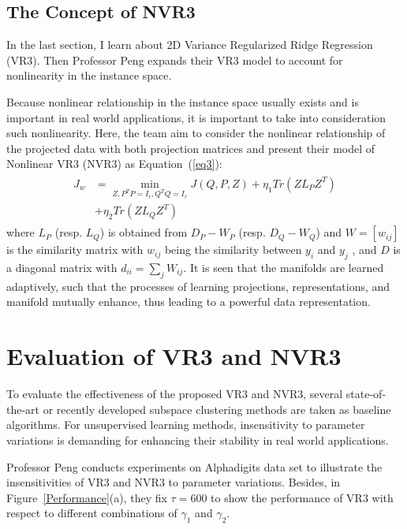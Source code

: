 \documentclass[twocolumn]{article}
\begin{document}
	\subsection{The Concept of NVR3}
	In the last section, I learn about 2D Variance Regularized Ridge Regression (VR3). Then Professor Peng expands their VR3 model to account for nonlinearity in the instance space. 
	
	Because nonlinear relationship in the instance space usually exists and is important in real world applications, it is important to take into consideration such nonlinearity. Here, the team aim to consider the nonlinear relationship of the projected data with both projection matrices and present their model of Nonlinear VR3 (NVR3) as Equation~(\ref{eq3}):
	\begin{equation}
	\begin{aligned}
	\begin{split}
	J_w&= \min_{Z,P^TP=I_r,Q^TQ=I_r}J(Q,P,Z)+ \eta_1 Tr\left(ZL_PZ^T\right) \\
	&+\eta_2 Tr\left(ZL_QZ^T\right)    \label{eq3}
	\end{split} 
	\end{aligned}
	\end{equation}
	where $L_P$ (resp. $L_Q$) is obtained from $D_P-W_P$ (resp. $D_Q-W_Q$) and $W = \left[w_{ij}\right] $ is the similarity matrix with $w_{ij}$ being the similarity between $y_i$ and $y_j$ , and $D$ is a diagonal matrix with $d_{ii}=\sum_{j}W_{ij}$. It is seen that the manifolds are learned adaptively, such that the processes of learning projections, representations, and manifold mutually enhance, thus leading to a powerful data representation.

    \section{Evaluation of VR3 and NVR3}
    To evaluate the effectiveness of the proposed VR3 and NVR3, several state-of-the-art or recently developed subspace clustering methods are taken as baseline algorithms. For unsupervised learning methods, insensitivity to parameter variations is demanding for enhancing their stability in real world applications. 
    
    Professor Peng conducts experiments on Alphadigits data set to illustrate the insensitivities of VR3 and NVR3 to parameter variations. Besides, in Figure~\ref{Performance}(a), they fix $\tau=600$ to show the performance of VR3 with respect to different combinations of $\gamma_1$ and $\gamma_2$. 
    
\end{document}
